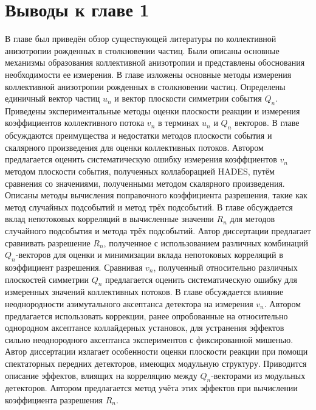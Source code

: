 \section{Выводы к главе 1}

В главе был приведён обзор существующей литературы по коллективной анизотропии рожденных в столкновении частиц. 
Были описаны основные механизмы образования коллективной анизотропии и представлены обоснования необходимости ее измерения.
В главе изложены основные методы измерения коллективной анизотропии рожденных в столкновении частиц.
Определены единичный вектор частиц $u_n$ и вектор плоскости симметрии события $Q_n$.
Приведены экспериментальные методы оценки плоскости реакции и измерения коэффициентов коллективного потока $v_n$ в терминах $u_n$ и $Q_n$ векторов.
В главе обсуждаются преимущества и недостатки методов плоскости события и скалярного произведения для оценки коллективных потоков. 
Автором предлагается оценить систематическую ошибку измерения коэффциентов $v_n$ методом плоскости события, полученных коллаборацией HADES, путём сравнения со значениями, полученными методом скалярного произведения.
Описаны методы вычисления поправочного коэффициента разрешения, такие как метод случайных подсобытий и метод трёх подсобытий.
В главе обсуждается вклад непотоковых корреляций в вычисленные значеняи $R_n$ для методов случайного подсобытия и метода трёх подсобытий.
Автор диссертации предлагает сравнивать разрешение $R_n$, полученное с использованием различных комбинаций $Q_n$-векторов для оценки и минимизации вклада непотоковых корреляций в коэффициент разрешения. 
Сравнивая $v_n$, полученный относительно различных плоскостей симметрии $Q_n$ предлагается оценить систематическую ошибку для измеренных значений коллективных потоков. 
В главе обсуждается влияние неоднородности азимутального аксептанса детектора на измерения $v_n$.
Автором предлагается использовать коррекции, ранее опробованные на относительно однородном аксептансе коллайдерных установок, для устранения эффектов сильно неоднородного аксептанса экспериментов с фиксированной мишенью. 
Автор диссертации излагает особенности оценки плоскости реакции при помощи спектаторных передних детекторов, имеющих модульную структуру.
Приводится описание эффектов, влиящих на корреляцию между $Q_n$-векторами из модульных детекторов. 
Автором предлагается метод учёта этих эффектов при вычислении коэффициента разрешения $R_n$.